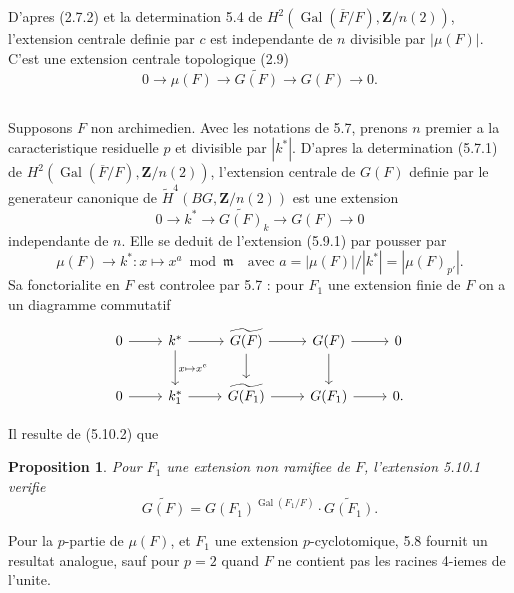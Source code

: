\documentclass[11pt,a4paper]{article}
\theoremstyle{plain}
\newtheorem{proposition}[theorem]{Proposition}
\theoremstyle{definition}
\DeclareMathOperator{\Gal}{Gal}
\begin{document}
D'apres (2.7.2) et la determination 5.4 de $H^2(\Gal(\overline{F}/F), \mathbf{Z}/n(2))$, l'extension centrale definie par $c$ est independante de $n$ divisible par $|\mu(F)|$. C'est une extension centrale topologique (2.9)
\begin{equation}\label{5.9.1}
0 \to \mu(F) \to \widetilde{G(F)} \to G(F) \to 0.
\end{equation}

\subsection{}\label{5.10}

Supposons $F$ non archimedien. Avec les notations de 5.7, prenons $n$ premier a la caracteristique residuelle $p$ et divisible par $|k^*|$. D'apres la determination (5.7.1) de $H^2(\Gal(\overline{F}/F), \mathbf{Z}/n(2))$, l'extension centrale de $G(F)$ definie par le generateur canonique de $\widetilde{H}^4(BG, \mathbf{Z}/n(2))$ est une extension
\begin{equation}\label{5.10.1}
0 \to k^* \to \widetilde{G(F)}_k \to G(F) \to 0
\end{equation}
independante de $n$. Elle se deduit de l'extension (5.9.1) par pousser par
\[
\mu(F) \to k^* : x \mapsto x^a \bmod{\mathfrak{m}} \quad \text{avec } a = |\mu(F)|/|k^*| = |\mu(F)_{p'}|.
\]
Sa fonctorialite en $F$ est controlee par 5.7 : pour $F_1$ une extension finie de $F$ on a un diagramme commutatif
\[
\begin{tikzcd}
0 \arrow{r} & k^* \arrow{r} \arrow{d}{x \mapsto x^e} & \widetilde{G(F)} \arrow{r} \arrow{d} & G(F) \arrow{r} \arrow{d} & 0 \\
0 \arrow{r} & k_1^* \arrow{r} & \widetilde{G(F_1)} \arrow{r} & G(F_1) \arrow{r} & 0.
\end{tikzcd}
\]

Il resulte de (5.10.2) que
\begin{proposition}\label{5.11}
Pour $F_1$ une extension non ramifiee de $F$, l'extension 5.10.1 verifie
\[
\widetilde{G(F)} = G(F_1)^{\Gal(F_1/F)} \cdot \widetilde{G(F_1)}.
\]
\end{proposition}

Pour la $p$-partie de $\mu(F)$, et $F_1$ une extension $p$-cyclotomique, 5.8 fournit un resultat analogue, sauf pour $p = 2$ quand $F$ ne contient pas les racines 4-iemes de l'unite.

\subsection{}\label{5.12}
\end{document}
